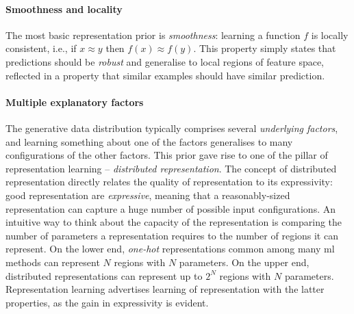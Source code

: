 \paragraph{\textbf{Smoothness and locality}} 
The most basic representation prior is \textit{smoothness}: learning a function $f$ is locally consistent, i.e., if $ x \approx y$ then $f(x) \approx f(y)$.
This property simply states that predictions should be \textit{robust} and generalise to local regions of feature space, reflected in a property that similar examples should have similar prediction.




\paragraph{\textbf{Multiple explanatory factors}} 
The generative data distribution typically comprises several \textit{underlying factors}, and learning something about one of the factors generalises to many configurations of the other factors.
This prior gave rise to one of the pillar of representation learning -- \textit{distributed representation}.
The concept of distributed representation directly relates the quality of representation to its expressivity: good representation are \textit{expressive}, meaning that a reasonably-sized representation can capture a huge number of possible input configurations.
An intuitive way to think about the capacity of the representation is comparing the number of parameters a representation requires to the number of regions it can represent.
On the lower end, \textit{one-hot} representations common among many \gls{ml} methods can represent $N$ regions with $N$ parameters.
On the upper end, distributed representations can represent up to $2^N$ regions with $N$ parameters.
Representation learning advertises learning of representation with the latter properties, as the gain in expressivity is evident.



